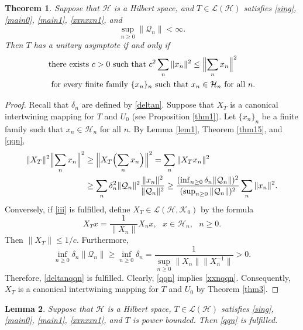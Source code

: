 \documentclass[a4paper,oneside,11pt]{amsart}
\numberwithin{equation}{section}
\theoremstyle{plain}
\newtheorem{theorem}{Theorem}[section]
\newtheorem{lemma}[theorem]{Lemma}
\theoremstyle{definition}
\begin{document}
\begin{theorem}\label{thmmain1} Suppose that $\mathcal H$ is a Hilbert space,  and 
  $T\in  \mathcal L(\mathcal H)$ satisfies   \eqref{sing}, \eqref{main0},    \eqref{main1},  \eqref{xxnxxn1}, and  
\begin{equation} \label{qqn} \sup_{n\geq 0} \|\mathcal Q_n\|<\infty.\end{equation}
Then
$T$ has a unitary asymptote if and only if 
\begin{equation}\label{iii}\begin{aligned}&\text{there exists } c>0  \text{  such that } c^2\sum_n\| x_n\|^2\leq
\Bigl \|\sum_n x_n\Bigr \|^2 \\ &
\text{ for every  finite family } \{x_n\}_n \text{  such that } x_n\in\mathcal H_n \text{ for all  }n. \end{aligned}\end{equation} 
\end{theorem}

\begin{proof} Recall that $\delta_n$ are defined by \eqref{deltan}.  
Suppose that $X_T$ is a canonical intertwining mapping for $T$ and $U_0$ (see Proposition \ref{thm1}). 
Let $\{x_n\}_n$ be a finite family such that $x_n\in\mathcal H_n$ for all $n$. By Lemma \ref{lem1}, Theorem \ref{thm15}, and \eqref{qqn}, 
\begin{equation*}\begin{aligned} \|X_T\|^2\Bigl \|\sum_n  x_n\Bigr \|^2&\geq\Bigl \|X_T\Bigl(\sum_n  x_n\Bigr)\Bigr \|^2 = \sum_n \|X_T x_n\|^2
\\&\geq 
\sum_n\delta_n^2\|\mathcal Q_n\|^2\frac{\|x_n\|^2}{\|\mathcal Q_n\|^2}
\geq\frac{(\inf_{n\geq 0}\delta_n\|\mathcal Q_n\|)^2}{(\sup_{n\geq 0}\|\mathcal Q_n\|)^2}\sum_n\|x_n\|^2.
\end{aligned}\end{equation*} 
Conversely, if \eqref{iii} is fulfilled, 
define $X_T\in\mathcal L(\mathcal H, \mathcal K_0)$ by the formula
$$X_Tx=\frac{1}{\|X_n\|}X_n x, \ \ \ x\in \mathcal H_n, \ \ \ n\geq 0.$$
Then $\|X_T\|\leq1/c$. Furthermore, 
$$\inf_{n\geq 0}\delta_n\|\mathcal Q_n\|\geq\inf_{n\geq 0}\delta_n=\frac{1}{\sup_{n\geq 0}\|X_n\|\|X_n^{-1}\|}>0.$$
Therefore, \eqref{deltanqqn} is fulfilled. Clearly, \eqref{qqn} implies \eqref{xxnqqn}. Consequently, $X_T$ is a canonical intertwining mapping for $T$ and $U_0$ by Theorem \ref{thm3}. 
\end{proof}

\begin{lemma}\label{lempower} Suppose that $\mathcal H$ is a Hilbert space, 
  $T\in  \mathcal L(\mathcal H)$ satisfies   \eqref{sing}, \eqref{main0},  \eqref{main1},   \eqref{xxnxxn1}, and $T$ is power bounded. 
Then \eqref{qqn} is fulfilled. 
\end{lemma}
\end{document}
